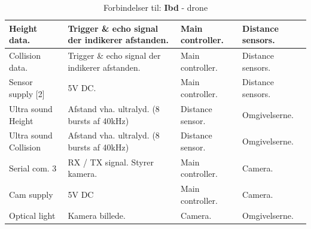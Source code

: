 \begin{table}[H]
\begin{tabular}	{|p{3.1 cm}|p{5.2 cm}|p{2.3 cm}|p{2.3 cm}|}
			Height data.		& Trigger \& echo signal der \newline indikerer afstanden. 	& Main \newline controller.	& Distance \newline sensors.	\\ \hline
			Collision data.		& Trigger \& echo signal der \newline indikerer afstanden. 	& Main \newline controller.	& Distance \newline sensors.  \\ \hline
			Sensor supply [2]	& 5V DC.	& Main \newline controller. & Distance \newline sensors.	\\ \hline
			Ultra sound \newline Height			& Afstand vha. ultralyd. \newline (8 bursts af 40kHz) 	& Distance \newline sensor.	& Omgivelserne.	\\ \hline 
			Ultra sound \newline	Collision		& Afstand vha. ultralyd. \newline (8 bursts af 40kHz) 	& Distance \newline sensor.	& Omgivelserne.	\\ \hline 			
				
			Serial com. 3		& RX / TX signal. \newline Styrer kamera.	& Main \newline controller.	& Camera.	\\ \hline
			Cam supply			& 5V DC 	& Main \newline controller.	& Camera.	\\ \hline
			Optical light		& Kamera billede. 	& Camera.	& Omgivelserne.	\\ \hline	
			
		\end{tabular}
	\caption{Forbindelser til: \textbf{Ibd} - drone}
	\label{tab:IBDdrone}
\end{table}

